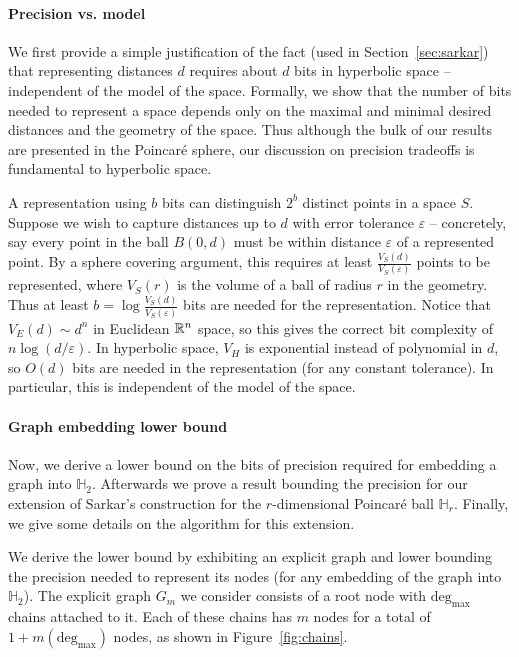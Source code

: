 \paragraph{Precision vs. model}

We first provide a simple justification of the fact (used in Section~\ref{sec:sarkar}) that representing distances $d$ requires about $d$ bits in hyperbolic space -- independent of the model of the space.
Formally, we show that the number of bits needed to represent a space depends only on the maximal and minimal desired distances and the geometry of the space.
Thus although the bulk of our results are presented in the Poincar{\'e} sphere, our discussion on precision tradeoffs is fundamental to hyperbolic space.

A representation using $b$ bits can distinguish $2^b$ distinct points in a space $S$.
Suppose we wish to capture distances up to $d$ with error tolerance $\varepsilon$ -- concretely, say every point in the ball $B(0,d)$ must be within distance $\varepsilon$ of a represented point.
By a sphere covering argument, this requires at least $\frac{V_S(d)}{V_S(\varepsilon)}$ points to be represented, where $V_S(r)$ is the volume of a ball of radius $r$ in the geometry.
Thus at least $b=\log \frac{V_S(d)}{V_S(\varepsilon)}$ bits are needed for the representation.
Notice that $V_E(d) \sim d^n$ in Euclidean $\mathbb{R}^n$ space, so this gives the correct bit complexity of $n \log(d/\varepsilon)$.
In hyperbolic space, $V_H$ is exponential instead of polynomial in $d$, so $O(d)$ bits are needed in the representation (for any constant tolerance).
In particular, this is independent of the model of the space.


\paragraph{Graph embedding lower bound}

Now, we derive a lower bound on the bits of precision required for embedding a graph into $\mathbb{H}_2$.
Afterwards we prove a result bounding the precision for our extension of Sarkar's construction for the $r$-dimensional Poincar\'{e} ball $\mathbb{H}_r$. Finally, we give some details on the algorithm for this extension.

We derive the lower bound by exhibiting an explicit graph and lower bounding the precision needed to represent its nodes (for any embedding of the graph into $\mathbb{H}_2$). The explicit graph $G_m$ we consider consists of a root node with $\text{deg}_{\max}$ chains attached to it. Each of these chains has $m$ nodes for a total of $1+m(\text{deg}_{\max})$ nodes, as shown in Figure~\ref{fig:chains}.

